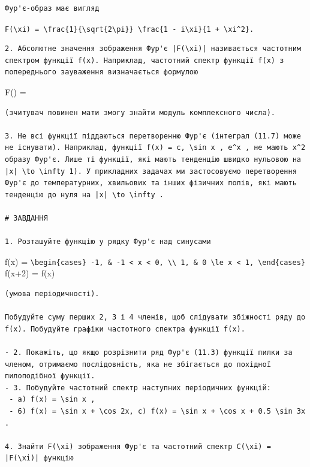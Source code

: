 \documentclass[
  ukrainian,
]{article}
\begin{document}
\begin{verbatim}
Фур'є-образ має вигляд
\end{verbatim}

\texttt{F(\textbackslash{}xi)\ =\ \textbackslash{}frac\{1\}\{\textbackslash{}sqrt\{2\textbackslash{}pi\}\}\ \textbackslash{}frac\{1\ -\ i\textbackslash{}xi\}\{1\ +\ \textbackslash{}xi\^{}2\}.}

\begin{verbatim}
2. Абсолютне значення зображення Фур'є |F(\xi)| називається частотним спектром функції f(x). Наприклад, частотний спектр функції f(x) з попереднього зауваження визначається формулою
\end{verbatim}

\textbar F(\xi)\textbar{} = 

\begin{verbatim}
(зчитувач повинен мати змогу знайти модуль комплексного числа).

3. Не всі функції піддаються перетворенню Фур'є (інтеграл (11.7) може не існувати). Наприклад, функції f(x) = c, \sin x , e^x , не мають x^2 образу Фур'є. Лише ті функції, які мають тенденцію швидко нульовою на |x| \to \infty 1). У прикладних задачах ми застосовуємо перетворення Фур'є до температурних, хвильових та інших фізичних полів, які мають тенденцію до нуля на |x| \to \infty .

# ЗАВДАННЯ

1. Розташуйте функцію у рядку Фур'є над синусами
\end{verbatim}

f(x) =
\texttt{\textbackslash{}begin\{cases\}\ -1,\ \&\ -1\ \textless{}\ x\ \textless{}\ 0,\ \textbackslash{}\textbackslash{}\ 1,\ \&\ 0\ \textbackslash{}le\ x\ \textless{}\ 1,\ \textbackslash{}end\{cases\}}
f(x+2) = f(x)

\begin{verbatim}
(умова періодичності).

Побудуйте суму перших 2, 3 і 4 членів, щоб слідувати збіжності ряду до f(x). Побудуйте графіки частотного спектра функції f(x).

- 2. Покажіть, що якщо розрізнити ряд Фур'є (11.3) функції пилки за членом, отримаємо послідовність, яка не збігається до похідної пилоподібної функції.
- 3. Побудуйте частотний спектр наступних періодичних функцій:
 - a) f(x) = \sin x ,
 - 6) f(x) = \sin x + \cos 2x, c) f(x) = \sin x + \cos x + 0.5 \sin 3x .

4. Знайти F(\xi) зображення Фур'є та частотний спектр C(\xi) = |F(\xi)| функцію
\end{verbatim}
\end{document}
